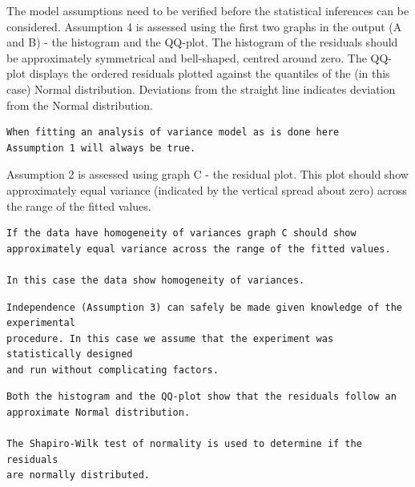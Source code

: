 \documentclass[a4paper, 10pt, fleqn, twosided]{memoir}
\begin{document}
The model assumptions need to be verified before the statistical inferences can be considered. Assumption 4 is assessed
using the first two graphs in the output (A and B) - the histogram and the QQ-plot. The histogram of the residuals
should be approximately symmetrical and bell-shaped, centred around zero. The QQ-plot displays the ordered residuals
plotted against the quantiles of the (in this case) Normal distribution. Deviations from the straight line indicates
deviation from the Normal distribution.

\begin{tcolorbox}[title = Example 4 Assumption 1]
\begin{verbatim}
When fitting an analysis of variance model as is done here
Assumption 1 will always be true.
\end{verbatim}
\end{tcolorbox}


Assumption 2 is assessed using graph C - the residual plot. This plot should show approximately equal variance
(indicated by the vertical spread about zero) across the range of the fitted values.

\begin{tcolorbox}[title = Example 4 Assumption 2]
\begin{verbatim}
If the data have homogeneity of variances graph C should show
approximately equal variance across the range of the fitted values.

In this case the data show homogeneity of variances.
\end{verbatim}
\end{tcolorbox}

\begin{tcolorbox}[title = Example 4 Assumption 3]
\begin{verbatim}
Independence (Assumption 3) can safely be made given knowledge of the experimental
procedure. In this case we assume that the experiment was statistically designed
and run without complicating factors.
\end{verbatim}
\end{tcolorbox}

\begin{tcolorbox}[title = Example 4 Assumption 4]
\begin{verbatim}
Both the histogram and the QQ-plot show that the residuals follow an
approximate Normal distribution.

The Shapiro-Wilk test of normality is used to determine if the residuals
are normally distributed.
\end{verbatim}
\end{tcolorbox}
\end{document}
